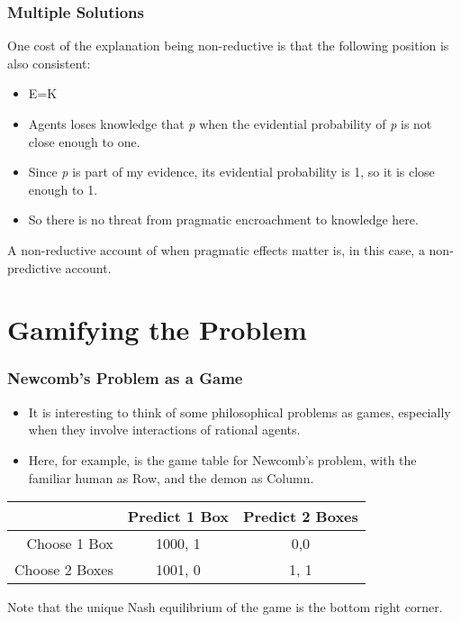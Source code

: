 \begin{frame}

\frametitle{Multiple Solutions}
\label{multiplesolutions}

One cost of the explanation being non-reductive is that the following position is also consistent:

\begin{itemize}
\item E=K

\item Agents loses knowledge that \emph{p} when the evidential probability of \emph{p} is not close enough to one.

\item Since \emph{p} is part of my evidence, its evidential probability is 1, so it is close enough to 1.

\item So there is no threat from pragmatic encroachment to knowledge here.

\end{itemize}

A non-reductive account of when pragmatic effects matter is, in this case, a non-predictive account.

\end{frame}

\section{Gamifying the Problem}
\label{gamifyingtheproblem}

\begin{frame}

\frametitle{Newcomb's Problem as a Game}
\label{newcombsproblemasagame}

\begin{itemize}
\item It is interesting to think of some philosophical problems as games, especially when they involve interactions of rational agents.

\item Here, for example, is the game table for Newcomb's problem, with the familiar human as Row, and the demon as Column.

\end{itemize}


\begin{center}
\begin{tabular}{r | c c}
 & Predict 1 Box & Predict 2 Boxes \\ \hline
Choose 1 Box & 1000, 1 & 0,0 \\
Choose 2 Boxes & 1001, 0 & 1, 1
\end{tabular}
\end{center}
\pause


Note that the unique Nash equilibrium of the game is the bottom right corner.

\end{frame}

